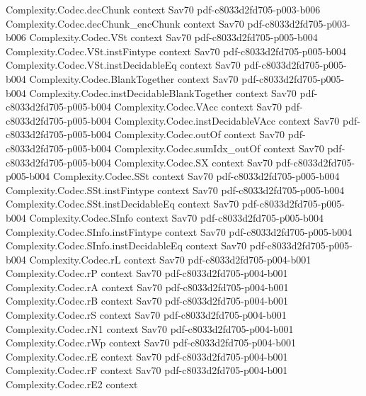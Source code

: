 \begin{theorem}
\proofstep
  {Complexity.Codec.decChunk}
  {context}
  {Sav70}
  {pdf-c8033d2fd705-p003-b006}
\proofstep
  {Complexity.Codec.decChunk_encChunk}
  {context}
  {Sav70}
  {pdf-c8033d2fd705-p003-b006}
\proofstep
  {Complexity.Codec.VSt}
  {context}
  {Sav70}
  {pdf-c8033d2fd705-p005-b004}
\proofstep
  {Complexity.Codec.VSt.instFintype}
  {context}
  {Sav70}
  {pdf-c8033d2fd705-p005-b004}
\proofstep
  {Complexity.Codec.VSt.instDecidableEq}
  {context}
  {Sav70}
  {pdf-c8033d2fd705-p005-b004}
\proofstep
  {Complexity.Codec.BlankTogether}
  {context}
  {Sav70}
  {pdf-c8033d2fd705-p005-b004}
\proofstep
  {Complexity.Codec.instDecidableBlankTogether}
  {context}
  {Sav70}
  {pdf-c8033d2fd705-p005-b004}
\proofstep
  {Complexity.Codec.VAcc}
  {context}
  {Sav70}
  {pdf-c8033d2fd705-p005-b004}
\proofstep
  {Complexity.Codec.instDecidableVAcc}
  {context}
  {Sav70}
  {pdf-c8033d2fd705-p005-b004}
\proofstep
  {Complexity.Codec.outOf}
  {context}
  {Sav70}
  {pdf-c8033d2fd705-p005-b004}
\proofstep
  {Complexity.Codec.sumIdx_outOf}
  {context}
  {Sav70}
  {pdf-c8033d2fd705-p005-b004}
\proofstep
  {Complexity.Codec.SX}
  {context}
  {Sav70}
  {pdf-c8033d2fd705-p005-b004}
\proofstep
  {Complexity.Codec.SSt}
  {context}
  {Sav70}
  {pdf-c8033d2fd705-p005-b004}
\proofstep
  {Complexity.Codec.SSt.instFintype}
  {context}
  {Sav70}
  {pdf-c8033d2fd705-p005-b004}
\proofstep
  {Complexity.Codec.SSt.instDecidableEq}
  {context}
  {Sav70}
  {pdf-c8033d2fd705-p005-b004}
\proofstep
  {Complexity.Codec.SInfo}
  {context}
  {Sav70}
  {pdf-c8033d2fd705-p005-b004}
\proofstep
  {Complexity.Codec.SInfo.instFintype}
  {context}
  {Sav70}
  {pdf-c8033d2fd705-p005-b004}
\proofstep
  {Complexity.Codec.SInfo.instDecidableEq}
  {context}
  {Sav70}
  {pdf-c8033d2fd705-p005-b004}
\proofstep
  {Complexity.Codec.rL}
  {context}
  {Sav70}
  {pdf-c8033d2fd705-p004-b001}
\proofstep
  {Complexity.Codec.rP}
  {context}
  {Sav70}
  {pdf-c8033d2fd705-p004-b001}
\proofstep
  {Complexity.Codec.rA}
  {context}
  {Sav70}
  {pdf-c8033d2fd705-p004-b001}
\proofstep
  {Complexity.Codec.rB}
  {context}
  {Sav70}
  {pdf-c8033d2fd705-p004-b001}
\proofstep
  {Complexity.Codec.rS}
  {context}
  {Sav70}
  {pdf-c8033d2fd705-p004-b001}
\proofstep
  {Complexity.Codec.rN1}
  {context}
  {Sav70}
  {pdf-c8033d2fd705-p004-b001}
\proofstep
  {Complexity.Codec.rWp}
  {context}
  {Sav70}
  {pdf-c8033d2fd705-p004-b001}
\proofstep
  {Complexity.Codec.rE}
  {context}
  {Sav70}
  {pdf-c8033d2fd705-p004-b001}
\proofstep
  {Complexity.Codec.rF}
  {context}
  {Sav70}
  {pdf-c8033d2fd705-p004-b001}
\proofstep
  {Complexity.Codec.rE2}
  {context}

\end{theorem}
